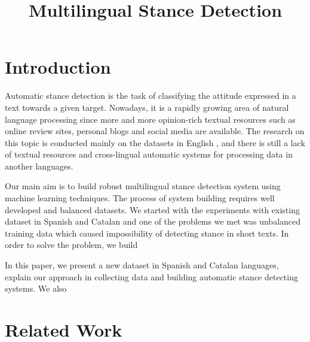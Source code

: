 \documentclass[10pt, a4paper]{article}
\title{Multilingual Stance Detection}
\begin{document}
\maketitleabstract

\section{Introduction}

Automatic stance detection is the task of classifying the attitude expressed in a text towards a given target. Nowadays, it is a rapidly growing area of natural language processing since more and more opinion-rich textual resources such as online review sites, personal blogs and social media are available. The research on this topic is conducted mainly on the datasets in English \cite{mohammad-etal-2016-semeval,augenstein-etal-2016-stance}, and there is still a lack of textual resources and cross-lingual automatic systems for processing data in another languages. 


Our main aim is to build robust multilingual stance detection system using machine learning techniques. The process of system building requires well developed and balanced datasets. We started with the experiments with existing dataset in Spanish and Catalan \cite{taule18} and one of the problems we met was unbalanced training data which caused impossibility of detecting stance in short texts. In order to solve the problem, we build  

In this paper, we present a new dataset in Spanish and Catalan languages, explain our approach in collecting data and building automatic stance detecting systems. We also 



\section{Related Work}
\end{document}
